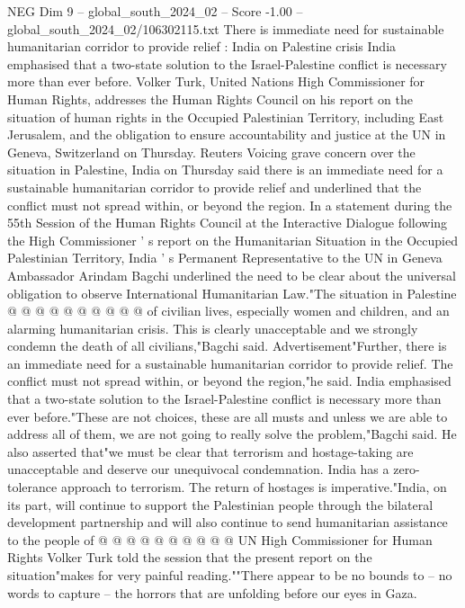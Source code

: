 \begin{textsample}{NEG Dim 9 – global\_south\_2024\_02 – Score -1.00 – global\_south\_2024\_02/106302115.txt}  \label{ex:f9_neg_362}
There is immediate need for sustainable humanitarian corridor to provide relief : India on Palestine crisis India emphasised that a two-state solution to the Israel-Palestine conflict is necessary more than ever before.
Volker Turk, United Nations High Commissioner for Human Rights, addresses the Human Rights Council on his report on the situation of human rights in the Occupied Palestinian Territory, including East Jerusalem, and the obligation to ensure accountability and justice at the UN in Geneva, Switzerland on Thursday.
Reuters Voicing grave concern over the situation in Palestine, India on Thursday said there is an immediate need for a sustainable humanitarian corridor to provide relief and underlined that the conflict must not spread within, or beyond the region.
In a statement during the 55th Session of the Human Rights Council at the Interactive Dialogue following the High Commissioner ' s report on the Humanitarian Situation in the Occupied Palestinian Territory, India ' s Permanent Representative to the UN in Geneva Ambassador Arindam Bagchi underlined the need to be clear about the universal obligation to observe International Humanitarian Law."The situation in Palestine @ @ @ @ @ @ @ @ @ @ of civilian lives, especially women and children, and an alarming humanitarian crisis.
This is clearly unacceptable and we strongly condemn the death of all civilians,"Bagchi said.
Advertisement"Further, there is an immediate need for a sustainable humanitarian corridor to provide relief.
The conflict must not spread within, or beyond the region,"he said.
India emphasised that a two-state solution to the Israel-Palestine conflict is necessary more than ever before."These are not choices, these are all musts and unless we are able to address all of them, we are not going to really solve the problem,"Bagchi said.
He also asserted that"we must be clear that terrorism and hostage-taking are unacceptable and deserve our unequivocal condemnation.
India has a zero-tolerance approach to terrorism.
The return of hostages is imperative."India, on its part, will continue to support the Palestinian people through the bilateral development partnership and will also continue to send humanitarian assistance to the people of @ @ @ @ @ @ @ @ @ @ UN High Commissioner for Human Rights Volker Turk told the session that the present report on the situation"makes for very painful reading.""There appear to be no bounds to -- no words to capture -- the horrors that are unfolding before our eyes in Gaza.

\end{textsample}
